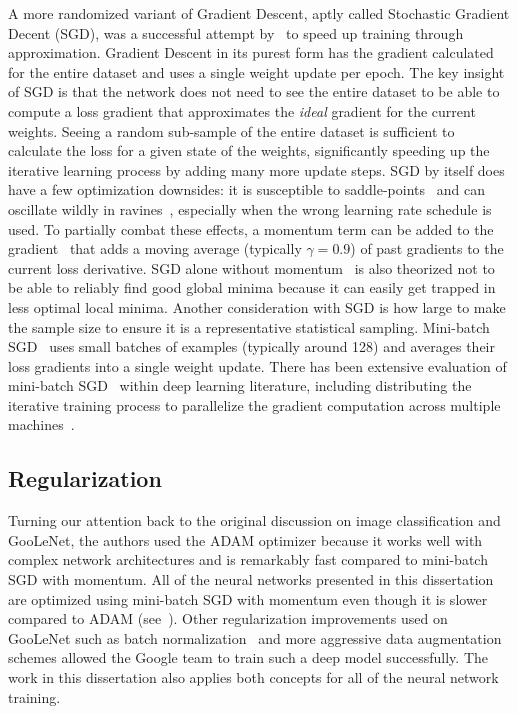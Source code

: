 A more randomized variant of Gradient Descent, aptly called Stochastic Gradient Decent (SGD), was a successful attempt by~\cite{robbins_stochastic_1951,gardner_learning_1984} to speed up training through approximation.  Gradient Descent in its purest form has the gradient calculated for the entire dataset and uses a single weight update per epoch.  The key insight of SGD is that the network does not need to see the entire dataset to be able to compute a loss gradient that approximates the \textit{ideal} gradient for the current weights.  Seeing a random sub-sample of the entire dataset is sufficient to calculate the loss for a given state of the weights, significantly speeding up the iterative learning process by adding many more update steps.  SGD by itself does have a few optimization downsides: it is susceptible to saddle-points~\cite{jin_how_2017} and can oscillate wildly in ravines~\cite{werfel_learning_2005}, especially when the wrong learning rate schedule is used.  To partially combat these effects, a momentum term can be added to the gradient~\cite{qian_momentum_1999,nesterov_method_1983} that adds a moving average (typically $\gamma = 0.9$) of past gradients to the current loss derivative.  SGD alone without momentum~\cite{bengio_advances_2012} is also theorized not to be able to reliably find good global minima because it can easily get trapped in less optimal local minima.  Another consideration with SGD is how large to make the sample size to ensure it is a representative statistical sampling.  Mini-batch SGD~\cite{li_efficient_2014} uses small batches of examples (typically around 128) and averages their loss gradients into a single weight update.  There has been extensive evaluation of mini-batch SGD~\cite{ruder_overview_2016,keskar_improving_2017,schaul_no_2012,bengio_learning_2009} within deep learning literature, including distributing the iterative training process to parallelize the gradient computation across multiple machines~\cite{hecht-nielsen_theory_1989,krizhevsky_one_2014,dean_large_2012}.

\subsection{Regularization}

Turning our attention back to the original discussion on image classification and GooLeNet, the authors used the ADAM optimizer because it works well with complex network architectures and is remarkably fast compared to mini-batch SGD with momentum.  All of the neural networks presented in this dissertation are optimized using mini-batch SGD with momentum even though it is slower compared to ADAM (see~\cite{keskar_improving_2017}).  Other regularization improvements used on GooLeNet such as batch normalization~\cite{ioffe_batch_2015} and more aggressive data augmentation~\cite{taylor_improving_2017,eggert_benefit_2015} schemes allowed the Google team to train such a deep model successfully.  The work in this dissertation also applies both concepts for all of the neural network training.

